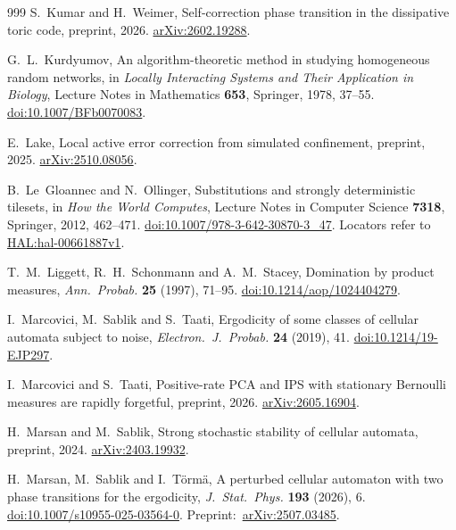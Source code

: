 \begin{thebibliography}{999}
S.~Kumar and H.~Weimer,
Self-correction phase transition in the dissipative toric code,
preprint, 2026.
\href{https://arxiv.org/abs/2602.19288}{arXiv:2602.19288}.

G.~L.~Kurdyumov,
An algorithm-theoretic method in studying homogeneous random networks,
in \emph{Locally Interacting Systems and Their Application in Biology}, Lecture Notes in Mathematics \textbf{653}, Springer, 1978, 37--55.
\href{https://doi.org/10.1007/BFb0070083}{doi:10.1007/BFb0070083}.

E.~Lake,
Local active error correction from simulated confinement,
preprint, 2025.
\href{https://arxiv.org/abs/2510.08056}{arXiv:2510.08056}.

B.~Le~Gloannec and N.~Ollinger,
Substitutions and strongly deterministic tilesets,
in \emph{How the World Computes},
Lecture Notes in Computer Science \textbf{7318}, Springer, 2012, 462--471.
\href{https://doi.org/10.1007/978-3-642-30870-3_47}{doi:10.1007/978-3-642-30870-3\_47}.
Locators refer to \href{https://hal.science/hal-00661887v1}{HAL:hal-00661887v1}.

T.~M.~Liggett, R.~H.~Schonmann and A.~M.~Stacey,
Domination by product measures,
\emph{Ann.~Probab.} \textbf{25} (1997), 71--95.
\href{https://doi.org/10.1214/aop/1024404279}{doi:10.1214/aop/1024404279}.

I.~Marcovici, M.~Sablik and S.~Taati,
Ergodicity of some classes of cellular automata subject to noise,
\emph{Electron.~J.~Probab.} \textbf{24} (2019), 41.
\href{https://doi.org/10.1214/19-EJP297}{doi:10.1214/19-EJP297}.

I.~Marcovici and S.~Taati,
Positive-rate PCA and IPS with stationary Bernoulli measures are rapidly forgetful,
preprint, 2026.
\href{https://arxiv.org/abs/2605.16904}{arXiv:2605.16904}.

H.~Marsan and M.~Sablik,
Strong stochastic stability of cellular automata,
preprint, 2024.
\href{https://arxiv.org/abs/2403.19932}{arXiv:2403.19932}.

H.~Marsan, M.~Sablik and I.~T\"orm\"a,
A perturbed cellular automaton with two phase transitions for the ergodicity,
\emph{J.~Stat.~Phys.} \textbf{193} (2026), 6.
\href{https://doi.org/10.1007/s10955-025-03564-0}{doi:10.1007/s10955-025-03564-0}.
Preprint:~\href{https://arxiv.org/abs/2507.03485}{arXiv:2507.03485}.


\end{thebibliography}
